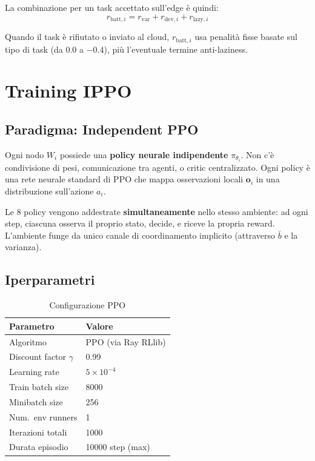 \documentclass[11pt,a4paper]{article}
\begin{document}
La combinazione per un task accettato sull'edge \`e quindi:
\begin{equation}
r_{\text{batt},i} = r_{\text{var}} + r_{\text{dev},i} + r_{\text{lazy},i}
\end{equation}

Quando il task \`e rifiutato o inviato al cloud, $r_{\text{batt},i}$ usa penalità fisse basate sul tipo di task (da 0.0 a $-0.4$), pi\`u l'eventuale termine anti-laziness.

\section{Training IPPO}

\subsection{Paradigma: Independent PPO}

Ogni nodo $W_i$ possiede una \textbf{policy neurale indipendente} $\pi_{\theta_i}$. Non c'\`e condivisione di pesi, comunicazione tra agenti, o critic centralizzato. Ogni policy \`e una rete neurale standard di PPO che mappa osservazioni locali $\mathbf{o}_i$ in una distribuzione sull'azione $a_i$.

Le 8 policy vengono addestrate \textbf{simultaneamente} nello stesso ambiente: ad ogni step, ciascuna osserva il proprio stato, decide, e riceve la propria reward. L'ambiente funge da unico canale di coordinamento implicito (attraverso $\bar{b}$ e la varianza).

\subsection{Iperparametri}

\begin{table}[h]
\centering
\caption{Configurazione PPO}
\label{tab:hyperparams}
\begin{tabular}{@{}ll@{}}
\toprule
\textbf{Parametro} & \textbf{Valore} \\
\midrule
Algoritmo & PPO (via Ray RLlib) \\
Discount factor $\gamma$ & 0.99 \\
Learning rate & $5 \times 10^{-4}$ \\
Train batch size & 8000 \\
Minibatch size & 256 \\
Num.\ env runners & 1 \\
Iterazioni totali & 1000 \\
Durata episodio & 10000 step (max) \\
\bottomrule
\end{tabular}
\end{table}
\end{document}

